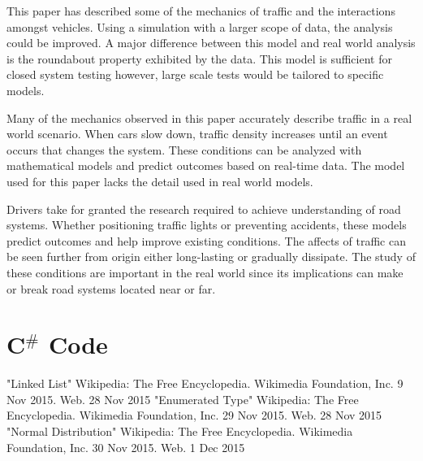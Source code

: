 \documentclass[12pt]{extarticle}
\begin{document}
This paper has described some of the mechanics of traffic and the interactions amongst vehicles. Using a simulation with a larger scope of data, the analysis could be improved. A major difference between this model and real world analysis is the roundabout property exhibited by the data. This model is sufficient for closed system testing however, large scale tests would be tailored to specific models.

Many of the mechanics observed in this paper accurately describe traffic in a real world scenario. When cars slow down, traffic density increases until an event occurs that changes the system. These conditions can be analyzed with mathematical models and predict outcomes based on real-time data. The model used for this paper lacks the detail used in real world models.

Drivers take for granted the research required to achieve understanding of road systems. Whether positioning traffic lights or preventing accidents, these models predict outcomes and help improve existing conditions. The affects of traffic can be seen further from origin either long-lasting or gradually dissipate. The study of these conditions are important in the real world since its implications can make or break road systems located near or far.








\newpage

\lstset{basicstyle=\footnotesize,breaklines=true}
\lstset{framextopmargin=50pt,frame=bottomline}

\section{C$^{\#}$ Code}




\newpage
\begin{thebibliography}{99}
"Linked List" Wikipedia: The Free Encyclopedia. Wikimedia Foundation, Inc. 9 Nov 2015. Web. 28 Nov 2015
"Enumerated Type" Wikipedia: The Free Encyclopedia. Wikimedia Foundation, Inc. 29 Nov 2015. Web. 28 Nov 2015
"Normal Distribution" Wikipedia: The Free Encyclopedia. Wikimedia Foundation, Inc. 30 Nov 2015. Web. 1 Dec 2015

\end{thebibliography}
\end{document}

